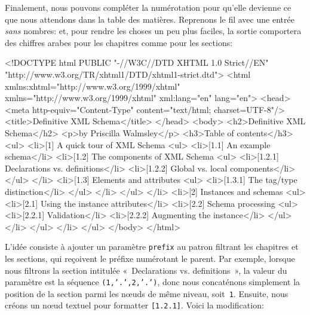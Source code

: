 \bigskip

Finalement, nous pouvons compléter la numérotation pour qu'elle
devienne ce que nous attendons dans la table des matières. Reprenons
le fil avec une entrée \emph{sans} nombres:
\noindent et, pour rendre les choses un peu plus faciles, la sortie
comportera des chiffres arabes pour les chapitres comme pour les sections:
\begin{sverb}
<!DOCTYPE html
  PUBLIC "-//W3C//DTD XHTML 1.0 Strict//EN"
         "http://www.w3.org/TR/xhtml1/DTD/xhtml1-strict.dtd">
<html xmlns:xhtml="http://www.w3.org/1999/xhtml"
      xmlns="http://www.w3.org/1999/xhtml"
      xml:lang="en" lang="en">
  <head><meta http-equiv="Content-Type"
              content="text/html; charset=UTF-8"/>
        <title>Definitive XML Schema</title>
  </head>
  <body>
    <h2>Definitive XML Schema</h2>
    <p>by Priscilla Walmsley</p>
    <h3>Table of contents</h3>
    <ul>
      <li>[1] A quick tour of XML Schema
        <ul>
          <li>[1.1] An example schema</li>
          <li>[1.2] The components of XML Schema
            <ul>
              <li>[1.2.1] Declarations vs. definitions</li>
              <li>[1.2.2] Global vs. local components</li>
            </ul>
          </li>
          <li>[1.3] Elements and attributes
            <ul>
              <li>[1.3.1] The tag/type distinction</li>
            </ul>
          </li>
        </ul>
      </li>
      <li>[2] Instances and schemas
        <ul>
          <li>[2.1] Using the instance attributes</li>
          <li>[2.2] Schema processing
            <ul>
              <li>[2.2.1] Validation</li>
              <li>[2.2.2] Augmenting the instance</li>
            </ul>
          </li>
        </ul>
      </li>
    </ul>
  </body>
</html>
\end{sverb}
L'idée consiste à ajouter un paramètre \texttt{prefix} au patron
filtrant les chapitres et les sections, qui reçoivent le préfixe
numérotant le parent. Par exemple, lorsque nous filtrons la section
intitulée «~Declarations vs. definitions~», la valeur du paramètre est
la séquence \texttt{(1,'.',2,'.')}, donc nous concaténons simplement
la position de la section parmi les nœuds de même niveau,
soit~\texttt{1}. Ensuite, nous créons un nœud textuel pour
formatter \texttt{[1.2.1]}. Voici la modification:
